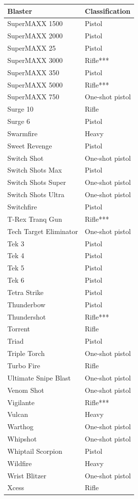\begin{table}
\begin{tabular}{|l|l|} \hline 
Blaster & Classification \\
 \hline SuperMAXX 1500 & Pistol \\
 \hline SuperMAXX 2000 & Pistol \\
 \hline SuperMAXX 25 & Pistol \\
 \hline SuperMAXX 3000 & Rifle*** \\
 \hline SuperMAXX 350 & Pistol \\
 \hline SuperMAXX 5000 & Rifle*** \\
 \hline SuperMAXX 750 & One-shot pistol \\
 \hline Surge 10 & Rifle \\
 \hline Surge 6 & Pistol \\
 \hline Swarmfire & Heavy \\
 \hline Sweet Revenge & Pistol \\
 \hline Switch Shot & One-shot pistol \\
 \hline Switch Shots Max & Pistol \\
 \hline Switch Shots Super & One-shot pistol \\
 \hline Switch Shots Ultra & One-shot pistol \\
 \hline Switchfire & Pistol \\
 \hline T-Rex Tranq Gun & Rifle*** \\
 \hline Tech Target Eliminator & One-shot pistol \\
 \hline Tek 3 & Pistol \\
 \hline Tek 4 & Pistol \\
 \hline Tek 5 & Pistol \\
 \hline Tek 6 & Pistol \\
 \hline Tetra Strike & Pistol \\
 \hline Thunderbow & Pistol \\
 \hline Thundershot & Rifle*** \\
 \hline Torrent & Rifle \\
 \hline Triad & Pistol \\
 \hline Triple Torch & One-shot pistol \\
 \hline Turbo Fire & Rifle \\
 \hline Ultimate Snipe Blast & One-shot pistol \\
 \hline Venom Shot & One-shot pistol \\
 \hline Vigilante & Rifle*** \\
 \hline Vulcan & Heavy \\
 \hline Warthog & One-shot pistol \\
 \hline Whipshot & One-shot pistol \\
 \hline Whiptail Scorpion & Pistol \\
 \hline Wildfire & Heavy \\
 \hline Wrist Blitzer & One-shot pistol \\
 \hline Xcess & Rifle \\
 \hline \end{tabular}

\end{table}

